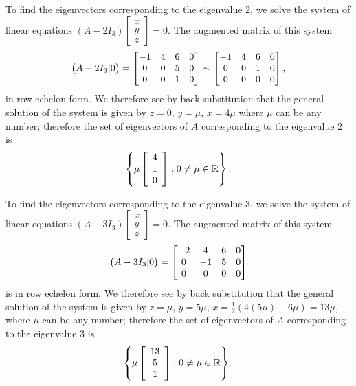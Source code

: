 \documentclass[a4paper]{amsart}
\renewenvironment{solution}{\SolutionInline}{\endSolutionInline}
\begin{document}
\begin{solution}
 To find the eigenvectors corresponding to the eigenvalue $2$, we
 solve the system of linear equations $(A - 2I_3)\left[
 \begin{array}{c}x \\ y\\z
 \end{array} \right] = 0$. The augmented matrix of this system
 $$
 \big(A - 2I_3|0\big) = \left[\begin{matrix} -1& 4&
 6&0\\0&0&5&0\\0&0&1&0\end{matrix}\right] \sim \left[\begin{matrix} -1& 4&
 6&0\\0&0&1&0\\0&0&0&0\end{matrix}\right],
 $$
 in row echelon form. We therefore see by back substitution that
 the general solution of the system is given by $z = 0$, $y = \mu$,
 $x = 4\mu$ where $\mu$ can be any number; therefore the set of
 eigenvectors of $A$ corresponding to the eigenvalue $2$ is
 $$
 \left\{ \mu \left[ \begin{array}{c} 4\\1\\0
 \end{array} \right] : 0 \neq \mu \in {\mathbb{R}} \right\}.
 $$

 To find the eigenvectors corresponding to the eigenvalue $3$, we
 solve the system of linear equations $(A - 3I_3)\left[
 \begin{array}{c}x \\ y\\z
 \end{array} \right] = 0$. The augmented matrix of this system
 $$
 \big(A - 3I_3|0\big) = \left[\begin{matrix} -2& 4&
 6&0\\0&-1&5&0\\0&0&0&0\end{matrix}\right]
 $$
 is in row echelon form. We therefore see by back substitution that
 the general solution of the system is given by $z = \mu$, $y =
 5\mu$, $x = \frac{1}{2}(4(5\mu) + 6\mu) = 13\mu$,  where $\mu$ can
 be any number; therefore the set of eigenvectors of $A$
 corresponding to the eigenvalue $3$ is
 $$
 \left\{ \mu \left[ \begin{array}{c} 13\\5\\1
 \end{array} \right] : 0 \neq \mu \in {\mathbb{R}} \right\}.
 $$
\end{solution}
\end{document}
